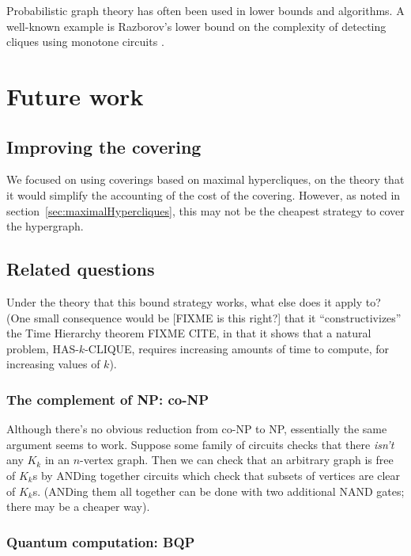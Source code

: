 \documentclass[12pt]{article}
\theoremstyle{definition}
\begin{document}
Probabilistic graph theory has often been used in
lower bounds and algorithms. A well-known example is Razborov's lower
bound on the complexity of detecting cliques using monotone circuits
\cite{Razborov85lowerbounds}.


\section{Future work}

\subsection{Improving the covering}

We focused on using coverings based on maximal hypercliques, on
the theory that it would simplify the accounting of the cost of
the covering.
However, as noted in section~\ref{sec:maximalHypercliques}, this
may not be the cheapest strategy to cover the hypergraph.

\subsection{Related questions}

Under the theory that this bound strategy works, what else does
it apply to? (One small consequence would be
[FIXME is this right?] that it ``constructivizes''
the Time Hierarchy theorem FIXME CITE, in that it shows that
a natural problem, HAS-$k$-CLIQUE, requires increasing amounts of
time to compute, for increasing values of $k$).

\subsubsection{The complement of NP: co-NP}

Although there's no obvious reduction from co-NP to NP, essentially
the same argument seems to work. Suppose some family of circuits
checks that there {\em isn't} any $K_k$ in an $n$-vertex graph.
Then we can check that an arbitrary graph is free of $K_k$s by
ANDing together circuits which check that subsets of vertices are
clear of $K_k$s. (ANDing them all together can be done with
two additional NAND gates; there may be a cheaper way).

\subsubsection{Quantum computation: BQP}
\end{document}
